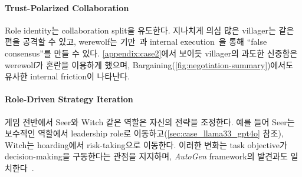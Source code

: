 \paragraph{\textbf{Trust-Polarized Collaboration}} Role identity는 collaboration split을 유도한다. 지나치게 의심 많은 villager는 같은 편을 공격할 수 있고, werewolf는 기만~\citep{Fehr2000}과 internal execution~\citep{Woolley2010}을 통해 ``false consensus''를 만들 수 있다. \ref{appendix:case2}에서 보이듯 villager의 과도한 신중함은 werewolf가 혼란을 이용하게 했으며, Bargaining(\ref{fig:negotiation-summary})에서도 유사한 internal friction이 나타난다.

\paragraph{\textbf{Role-Driven Strategy Iteration}} 게임 전반에서 Seer와 Witch 같은 역할은 자신의 전략을 조정한다. 예를 들어 Seer는 보수적인 역할에서 leadership role로 이동하고(\ref{sec:case_llama33_gpt4o} 참조), Witch는 hoarding에서 risk-taking으로 이동한다. 이러한 변화는 task objective가 decision-making을 구동한다는 관점을 지지하며, \textit{AutoGen} framework의 발견과도 일치한다~\citep{Wu2023}.

